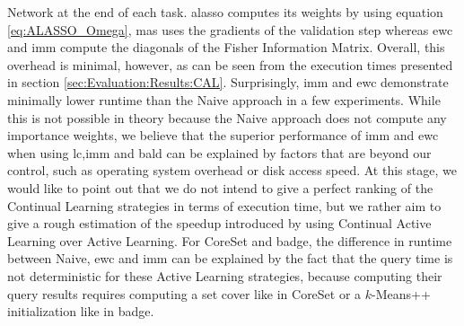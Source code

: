 Network at the end of each task. \gls{alasso} computes its weights by using equation \ref{eq:ALASSO_Omega}, \gls{mas} uses the gradients of the validation step whereas
\gls{ewc} and \gls{imm} compute the diagonals of the Fisher Information Matrix. Overall, this overhead is minimal, however, as can be seen from the execution times presented
in section \ref{sec:Evaluation:Results:CAL}. Surprisingly, \gls{imm} and \gls{ewc} demonstrate minimally lower runtime than the Naive approach in a few experiments. While
this is not possible in theory because the Naive approach does not compute any importance weights, we believe that the superior performance of \gls{imm} and \gls{ewc} when
using \gls{lc},\gls{imm} and \gls{bald} can be explained by factors that are beyond our control, such as operating system overhead or disk access speed. At this stage,
we would like to point out that we do not intend to give a perfect ranking of the Continual Learning strategies in terms of execution time, but we rather aim to
give a rough estimation of the speedup introduced by using Continual Active Learning over Active Learning. For CoreSet and \gls{badge}, the difference in runtime
between Naive, \gls{ewc} and \gls{imm} can be explained by the fact that the query time is not deterministic for these Active Learning strategies, because computing their
query results requires computing a set cover like in CoreSet or a $k$-Means++ initialization like in \gls{badge}. \par



